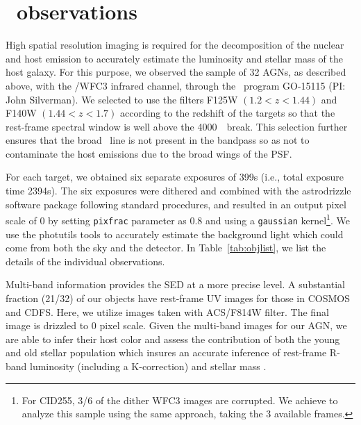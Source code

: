 \documentclass[apj]{emulateapj}
\begin{document}
\section{\hst\ observations}
\label{observation}
High spatial resolution imaging is required for the decomposition of the nuclear and host emission to accurately estimate the luminosity and stellar mass of the host galaxy. For this purpose, we observed the sample of 32 AGNs, as described above, with the \hst/WFC3 infrared channel, through the \hst\ program GO-15115 (PI: John Silverman). We selected to use the filters F125W $(1.2<z<1.44)$ and F140W $(1.44<z<1.7)$ according to the redshift of the targets so that the rest-frame spectral window is well above the 4000~\angstrom\ break. This selection further ensures that the broad \halpha\ line is not present in the bandpass so as not to contaminate the host emissions due to the broad wings of the PSF.

For each target, we obtained six separate exposures of 399s (i.e., total exposure time 2394s). The six exposures were dithered and combined with the {\sc astrodrizzle} software package following standard procedures, and resulted in an output pixel scale of 0 by setting \texttt{pixfrac} parameter as 0.8 and using a \texttt{gaussian} kernel\footnote{\label{note1}For CID255, 3/6 of the dither WFC3 images are corrupted. We achieve to analyze this sample using the same approach, taking the 3 available frames.}. We use the {\sc photutils} tools to accurately estimate the background light which could come from both the sky and the detector. In Table~\ref{tab:objlist}, we list the details of the individual observations.

Multi-band information provides the SED at a more precise level. A substantial fraction (21/32) of our objects have rest-frame UV images for those in COSMOS \citep{Koekemoer2007} and CDFS. Here, we utilize images taken with ACS/F814W filter. The final image is drizzled to 0 pixel scale. Given the multi-band images for our AGN, we are able to infer their host color and assess the contribution of both the young and old stellar population which insures an accurate inference of rest-frame R-band luminosity (including a K-correction) and stellar mass \citep{Gallazzi2009}. 
\end{document}
